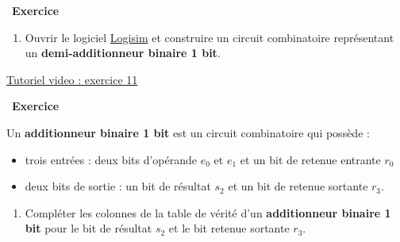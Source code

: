 \documentclass[
  11pt,
]{article}
\providecommand{\tightlist}{%
  \setlength{\itemsep}{0pt}\setlength{\parskip}{0pt}}
\newcounter{exo}
\newenvironment{exercice}[1]
{\par \medskip   \addtocounter{exo}{1} \noindent  
\begin{bclogo}[arrondi =0.1,   noborder = true, logo=\bccrayon, marge=4]{~\textbf{Exercice} \textbf{\theexo} {\itshape #1} }  \par}
{
\end{bclogo}
 \par \bigskip }
\newcounter{def}
\newcounter{logi}
\begin{document}
\begin{exercice}{}
\begin{enumerate}
\def\labelenumi{\arabic{enumi}.}
\setcounter{enumi}{4}
\tightlist
\item
  Ouvrir le logiciel \href{http://www.cburch.com/logisim/}{Logisim} et
  construire un circuit combinatoire représentant un
  \textbf{demi-additionneur binaire 1 bit}.
\end{enumerate}

\href{videos/exercice11.mp4}{Tutoriel video : exercice 11}

\end{exercice}

\begin{exercice}{}

Un \textbf{additionneur binaire 1 bit} est un circuit combinatoire qui
possède :

\begin{itemize}
\tightlist
\item
  trois entrées : deux bits d'opérande \(e_{0}\) et \(e_{1}\) et un bit
  de retenue entrante \(r_{0}\)
\item
  deux bits de sortie : un bit de résultat \(s_{2}\) et un bit de
  retenue sortante \(r_{3}\).
\end{itemize}

\begin{enumerate}
\def\labelenumi{\arabic{enumi}.}
\tightlist
\item
  Compléter les colonnes de la table de vérité d'un \textbf{additionneur
  binaire 1 bit} pour le bit de résultat \(s_{2}\) et le bit retenue
  sortante \(r_{3}\).
\end{enumerate}


\end{exercice}
\end{document}
